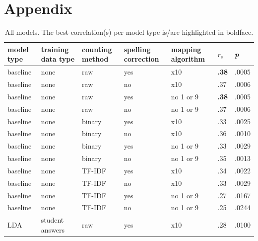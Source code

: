 \documentclass[a4paper,10pt,twoside]{article}
\begin{document}
\section*{Appendix}
\begin{table}[h]
	\centering
	\footnotesize
	\caption{All models. The best correlation(s) per model type is/are highlighted in boldface.}
	\label{all-models}
	\begin{tabular}{lllllll}
		\hline model type & training data type & counting method & spelling correction & mapping algorithm & $\textit{r}_s$   & \textit{p} \\
		\hline baseline   & none               & raw             & yes                 & x10               & \textbf{.38} & .0005       \\
		baseline   & none               & raw             & no                  & x10               & .37 & .0006       \\
		baseline   & none               & raw             & yes                 & no 1 or 9         & \textbf{.38} & .0005       \\
		baseline   & none               & raw             & no                  & no 1 or 9         & .37 & .0006       \\
		baseline   & none               & binary          & yes                 & x10               & .33 & .0025       \\
		baseline   & none               & binary          & no                  & x10               & .36 & .0010       \\
		baseline   & none               & binary          & yes                 & no 1 or 9         & .33 & .0029       \\
		baseline   & none               & binary          & no                  & no 1 or 9         & .35 & .0013       \\
		baseline   & none               & TF-IDF          & yes                 & x10               & .34 & .0022       \\
		baseline   & none               & TF-IDF          & no                  & x10               & .33 & .0029       \\
		baseline   & none               & TF-IDF          & yes                 & no 1 or 9         & .27 & .0167       \\
		baseline   & none               & TF-IDF          & no                  & no 1 or 9         & .25 & .0244       \\
		LDA        & student answers    & raw             & yes                 & x10               & .28 & .0100       \\

\end{tabular}
\end{table}
\end{document}
